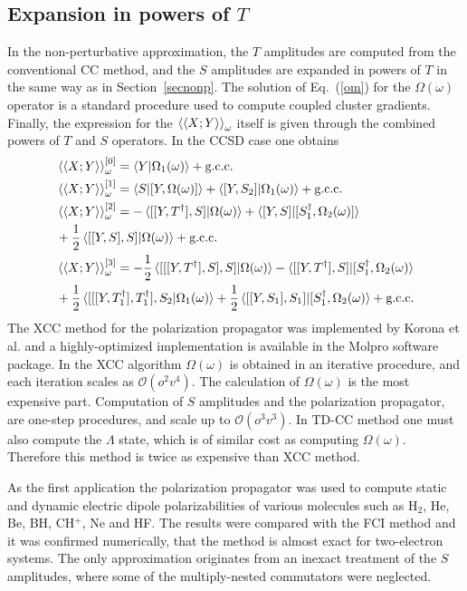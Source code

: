 \documentclass[preprint,12pt]{elsarticle}
\newcommand{\equa}[1]{\begin{align} #1 \end{align}}
\newcommand{\fr}[1]{Eq.~(\ref{#1})}
\newcommand{\frs}[1]{Section~\ref{#1}}
\newcommand{\odps}[1]{\braket{\braket{X;Y}}_\omega^{[#1]}}
\newcommand{\odp}{\braket{\braket{X;Y}}_\omega}
\begin{document}
\subsection{Expansion in powers of $T$}
In the non-perturbative approximation,
the $T$ amplitudes are computed from the conventional CC method, and the $S$ amplitudes are expanded in powers of $T$
in the same way as in \frs{secnonp}. The solution of \fr{om} for the $\Omega(\omega)$ operator is a standard procedure used to compute coupled
cluster gradients.\cite{salter1989analytic, korona2002electrostatic, scheiner1987analytic} Finally, the expression for the $\odp$ itself is given through the combined powers of $T$ and $S$ operators. In the CCSD case one obtains 
\equa{&\odps{0} = \braket{Y|\Omega_1(\omega)}+ \mbox{g.c.c.}\\
  &\odps{1} = \braket{S|[Y, \Omega(\omega)]} + \braket{[Y,S_2]|\Omega_1(\omega)}+ \mbox{g.c.c.}\nonumber\\
  &\odps{2} = -\braket{[[Y, T^\dagger], S]|\Omega(\omega)} + \braket{[Y, S]|[S_1^\dagger, \Omega_2(\omega)]} \nonumber\\
  &+ \frac12\braket{[[Y, S], S]|\Omega(\omega)} + \mbox{g.c.c.}\nonumber\\ 
  &\odps{3} = -\frac12\braket{[[[Y, T^\dagger], S], S]|\Omega(\omega)} - \braket{[[Y, T^\dagger], S]|[S_1^\dagger, \Omega_2(\omega)}\nonumber\\
      &+ \frac12\braket{[[[Y, T_1^\dagger],T_1^\dagger], S_2 |\Omega_1(\omega)} + \frac12\braket{[[Y, S_1], S_1]|[S_1^\dagger, \Omega_2(\omega)} + \mbox{g.c.c.}\nonumber
  }
The XCC method for the polarization propagator  was 
implemented by Korona et al.\cite{korona2006time, korona2006one, korona2008dispersion}
and a highly-optimized implementation is available
in the Molpro software package.\cite{molpro2015} In the XCC algorithm
 $\Omega(\omega)$ is obtained in an iterative procedure, and each iteration scales as $\mathscr{O}(o^2v^4)$. The calculation of
$\Omega(\omega)$ is the most expensive part. Computation of $S$ amplitudes and the polarization propagator, are one-step procedures, and
scale up to $\mathscr{O}(o^3v^3)$. In TD-CC method one must also compute the $\Lambda$ state, which is of similar cost as computing $\Omega(\omega)$.
Therefore this method is twice as expensive than XCC method.

As the first application the polarization propagator was used to compute static and
dynamic electric dipole polarizabilities\cite{korona2006time} of various molecules such as H$_2$, He, Be, BH, CH$^{+}$, Ne and HF.
The results were compared with the FCI method and it was confirmed numerically,
that the method is almost exact for
two-electron systems.\cite{moszynski2005time, korona2006time} The only approximation
originates from an inexact  treatment of the $S$ amplitudes, where
some of the multiply-nested commutators were neglected. 
\end{document}
